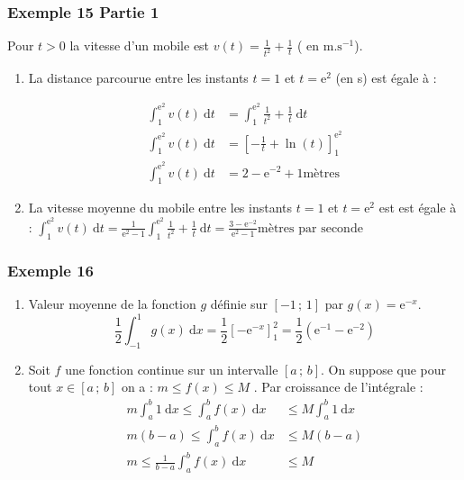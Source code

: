 \documentclass[11pt, hyperref={urlcolor=red,%
            linkcolor=blue, %
            colorlinks=true}]{beamer}
\newcommand{\Interff}[2]{\left[#1\, ;\, #2\right]}
\newcommand{\dx}{\ensuremath{\text{d}x}}		%
\newcommand{\dt}{\ensuremath{\text{d}t}}		%
\newcommand{\integralex}[3]{\int_{#1}^{#2} #3 \ \dx}
\newcommand{\integralet}[3]{\int_{#1}^{#2} #3 \ \dt}
\begin{document}
 

\begin{frame}
\frametitle{Exemple  15 Partie 1}
Pour $t>0$ la vitesse d'un mobile est $v(t)=\frac{1}{t^2}+\frac{1}{t}$ ( en $\text{m}.\text{s}^{-1}$).
\begin{enumerate}
\item La distance parcourue entre les instants $t=1$ et $t=\text{e}^2$ (en s) est égale à :

\begin{align*}
\integralet{1}{\text{e}^2}{v(t)} &= \integralet{1}{\text{e}^2}{\frac{1}{t^2}+\frac{1}{t}} \\
\integralet{1}{\text{e}^2}{v(t)} &= \left[-\frac{1}{t}+\ln(t)\right]_{1}^{\text{e}^2} \\
\integralet{1}{\text{e}^2}{v(t)} &= 2 -\text{e}^{-2}+1 \text{mètres}
\end{align*}


\item  La vitesse moyenne du mobile entre les instants $t=1$ et $t=\text{e}^2$ est est égale à :
$
\integralet{1}{\text{e}^2}{v(t)} = \frac{1}{\text{e}^2-1}\integralet{1}{\text{e}^2}{\frac{1}{t^2}+\frac{1}{t}}= \frac{3 -\text{e}^{-2}}{\text{e}^2-1} \text{mètres par seconde}$

\end{enumerate}
\end{frame}




\begin{frame}
\frametitle{Exemple  16}
\label{exemple16}

\begin{enumerate}
\item Valeur moyenne de la fonction  $g$ définie sur $\Interff{-1}{1}$ par \mbox{$g(x)=\text{e}^{-x}$}. 
\begin{equation*}
\frac{1}{2}\integralex{-1}{1}{g(x)} = \frac{1}{2} \left[-\text{e}^{-x}\right]_{1}^{2}= \frac{1}{2}\left(\text{e}^{-1}- \text{e}^{-2}  \right)
\end{equation*}
\item  Soit $f$ une fonction continue sur un intervalle $\Interff{a}{b}$.
On suppose que pour tout $x \in \Interff{a}{b}$ on a : $m \leqslant f(x) \leqslant M$ . Par croissance de l'intégrale :
\begin{align*}
m \integralex{a}{b}{1}  \leqslant \integralex{a}{b}{f(x)}  & \leqslant M \integralex{a}{b}{1}  \\
m (b-a) \leqslant \integralex{a}{b}{f(x)}  & \leqslant M(b-a) \\
 m \leqslant \frac{1}{b-a}\integralex{a}{b}{f(x)}  &\leqslant M
\end{align*}
\end{enumerate}
\end{frame}
\end{document}
